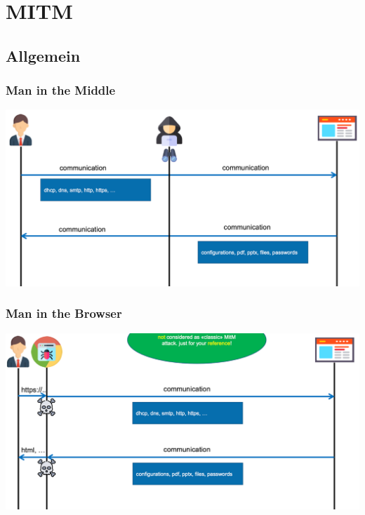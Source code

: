\section{MITM}\label{sec:mitm}

\subsection{Allgemein}\label{subsec:allgemein}

\subsubsection{Man in the Middle}\label{subsubsec:man-in-the-middle}
\begin{center}
    \includegraphics[width=1.0\linewidth]{./img/09-mitm/mitm_overview}
    \vspace{-8pt}
\end{center}
\vspace{-8pt}

\subsubsection{Man in the Browser}\label{subsubsec:man-in-the-browser}
\begin{center}
    \includegraphics[width=1.0\linewidth]{./img/09-mitm/mitb_overview}
    \vspace{-8pt}
\end{center}
\vspace{-8pt}

